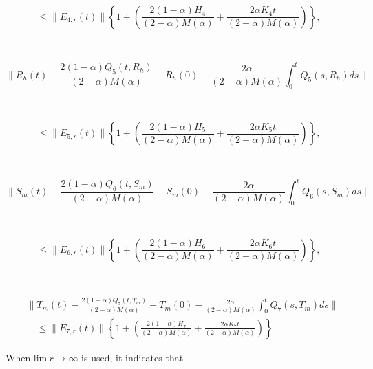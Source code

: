 \documentclass[10pt]{NSP1}
\begin{document}
~


\[
\leq \| E_{4,r}(t)\|\left\{ 1 + \left( \frac{2(1 - \alpha)H_{4}}{(2 - \alpha)M(\alpha)} + \frac{2\alpha K_{4}t}{(2 - \alpha)M(\alpha)} \right) \right\},
\]


~


\[
\| R_{h}(t) - \frac{2(1 - \alpha)Q_{5}\left( t,R_{h} \right)}{(2 - \alpha)M(\alpha)} - R_{h}(0) - \frac{2\alpha}{(2 - \alpha)M(\alpha)}\int_{0}^{t}{}Q_{5}\left( s,R_{h} \right)ds\|
\]


~


\[
\leq \| E_{5,r}(t)\|\left\{ 1 + \left( \frac{2(1 - \alpha)H_{5}}{(2 - \alpha)M(\alpha)} + \frac{2\alpha K_{5}t}{(2 - \alpha)M(\alpha)} \right) \right\},
\]


~


\[
\| S_{m}(t) - \frac{2(1 - \alpha)Q_{6}\left( t,S_{m} \right)}{(2 - \alpha)M(\alpha)} - S_{m}(0) - \frac{2\alpha}{(2 - \alpha)M(\alpha)}\int_{0}^{t}{}Q_{6}\left( s,S_{m} \right)ds\|
\]


~


\[
\leq \| E_{6,r}(t)\|\left\{ 1 + \left( \frac{2(1 - \alpha)H_{6}}{(2 - \alpha)M(\alpha)} + \frac{2\alpha K_{6}t}{(2 - \alpha)M(\alpha)} \right) \right\},
\]


~


\begin{equation}
\begin{aligned}
&\| T_{m}(t) - \frac{2(1 - \alpha)Q_{7}\left( t,T_{m} \right)}{(2 - \alpha)M(\alpha)} - T_{m}(0) - \frac{2\alpha}{(2 - \alpha)M(\alpha)}\int_{0}^{t}{}Q_{7}\left( s,T_{m} \right)ds\| \\
&\quad \leq \| E_{7,r}(t)\|\left\{ 1 + \left( \frac{2(1 - \alpha)H_{7}}{(2 - \alpha)M(\alpha)} + \frac{2\alpha K_{7}t}{(2 - \alpha)M(\alpha)} \right) \right\}
\end{aligned}
\end{equation}

When lim\(\ r \rightarrow \infty\) is used, it indicates that

\small
\end{document}
